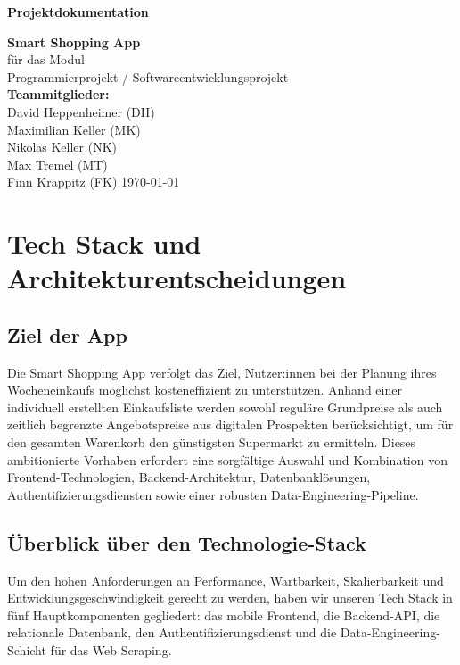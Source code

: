 \documentclass[12pt, a4paper]{report} %
\newcommand{\authorinitials}{} %
\begin{document}
\begin{titlepage}
    \centering
    \vspace*{4cm}
    {\LARGE\bfseries Projektdokumentation \par}
    \vspace{1.5cm}
    {\Large \textbf{Smart Shopping App} \\[3mm]}
    \vspace{1cm}
    {\large für das Modul\\
      Programmierprojekt / Softwareentwicklungsprojekt\\}
    \vspace{1.5cm}
    {\large
      \textbf{Teammitglieder:}\\[5mm]
      David Heppenheimer (DH)\\
      Maximilian Keller (MK)\\
      Nikolas Keller (NK)\\
      Max Tremel (MT)\\
      Finn Krappitz (FK)
    }
    \vfill
    {\large \today}
\end{titlepage}

\tableofcontents
\cleardoublepage
\chapter{Tech Stack und Architekturentscheidungen}
\renewcommand{\authorinitials}{DH}


\label{chap:tech_stack}

\section{Ziel der App}
Die Smart Shopping App verfolgt das Ziel, Nutzer:innen bei der Planung ihres Wocheneinkaufs möglichst kosteneffizient zu unterstützen. Anhand einer individuell erstellten Einkaufsliste werden sowohl reguläre Grundpreise als auch zeitlich begrenzte Angebots­preise aus digitalen Prospekten berücksichtigt, um für den gesamten Warenkorb den günstigsten Supermarkt zu ermitteln. Dieses ambitionierte Vorhaben erfordert eine sorgfältige Auswahl und Kombination von Frontend-Technologien, Backend-Architektur, Datenbanklösungen, Authentifizierungsdiensten sowie einer robusten Data-Engineering-Pipeline.

\section{Überblick über den Technologie-Stack}
Um den hohen Anforderungen an Performance, Wartbarkeit, Skalierbarkeit und Entwicklungsgeschwindigkeit gerecht zu werden, haben wir unseren Tech Stack in fünf Hauptkomponenten gegliedert: das mobile Frontend, die Backend-API, die relationale Datenbank, den Authentifizierungsdienst und die Data-Engineering-Schicht für das Web Scraping.
\end{document}
